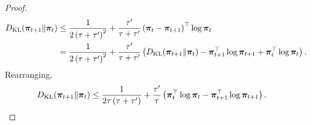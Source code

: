 \begin{proof}
\begin{equation*}
\begin{split}
    D_{\mathrm{KL}}{\left( {\boldsymbol{\pi}}_{t+1} \middle\| {\boldsymbol{\pi}}_t \right)} &\le \frac{1}{2\left(\tau + \tau^\prime\right)^2} + \frac{\tau^\prime}{\tau + \tau^\prime} \left( {\boldsymbol{\pi}}_t - {\boldsymbol{\pi}}_{t+1} \right)^\top \log{{\boldsymbol{\pi}}_t} \\
    &= \frac{1}{2\left(\tau + \tau^\prime\right)^2} + \frac{\tau^\prime}{\tau + \tau^\prime} \left( D_{\mathrm{KL}}{\left( {\boldsymbol{\pi}}_{t+1} \middle\| {\boldsymbol{\pi}}_t \right)} - {\boldsymbol{\pi}}_{t+1}^\top \log{{\boldsymbol{\pi}}_{t+1}} + {\boldsymbol{\pi}}_t^\top \log{{\boldsymbol{\pi}}_t} \right). 
\end{split}
\end{equation*}
Rearranging,
\begin{equation*}
\begin{split}
    D_{\mathrm{KL}}{\left( {\boldsymbol{\pi}}_{t+1} \middle\| {\boldsymbol{\pi}}_t \right)} &\le \frac{1}{2\tau \left(\tau + \tau^\prime\right)} + \frac{\tau^\prime}{\tau} \left( {\boldsymbol{\pi}}_t^\top \log{{\boldsymbol{\pi}}_t} -  {\boldsymbol{\pi}}_{t+1}^\top \log{{\boldsymbol{\pi}}_{t+1}}  \right). \qedhere
\end{split}
\end{equation*}
\end{proof}

